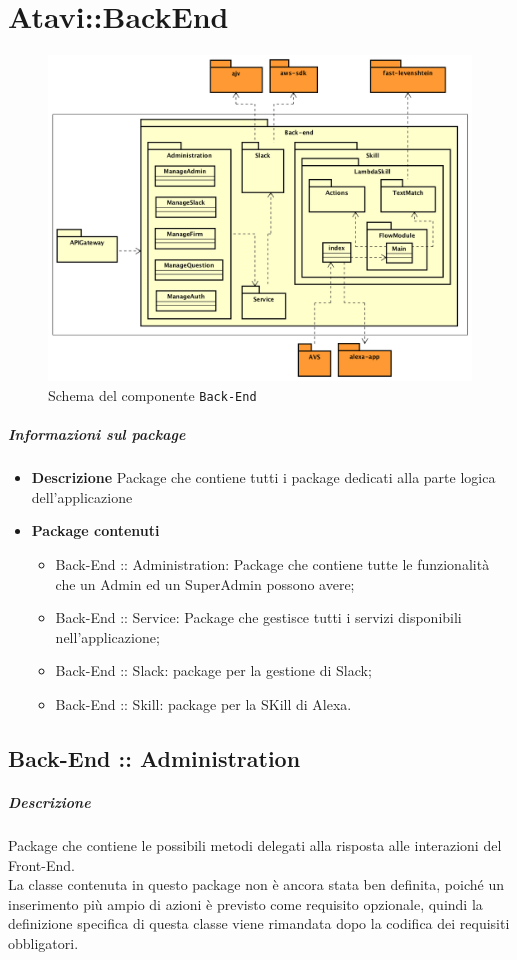 \documentclass[../ManualeSviluppatore_v2.0.0.tex]{subfiles}
\begin{document}
\section{Atavi::BackEnd}

\begin{figure}[!h]
	\centering
	\includegraphics[scale=0.3]{Architettura/Back-end.png}
	\caption{Schema del componente \texttt{Back-End}}
\end{figure}
\subparagraph{Informazioni sul package}
\begin{itemize}
	\item \textbf{Descrizione} Package che contiene tutti i package dedicati alla parte logica dell'applicazione
	\item \textbf{Package contenuti}
	      \begin{itemize}
	      	\item Back-End :: Administration: Package che contiene tutte le funzionalità che un Admin ed un SuperAdmin possono avere;
	      	\item Back-End :: Service: Package che gestisce tutti i servizi disponibili nell'applicazione;
	      	\item Back-End :: Slack: package per la gestione di Slack;
	      	\item Back-End :: Skill: package per la SKill di Alexa.
	      \end{itemize}
\end{itemize}

\subsection{Back-End :: Administration}
\subparagraph{Descrizione} Package che contiene le possibili metodi delegati alla risposta alle interazioni del Front-End.\\
La classe contenuta in questo package non è ancora stata ben definita, poiché un inserimento più ampio di azioni è previsto come requisito opzionale, quindi la definizione specifica di questa classe viene rimandata dopo la codifica dei requisiti obbligatori.
\end{document}
